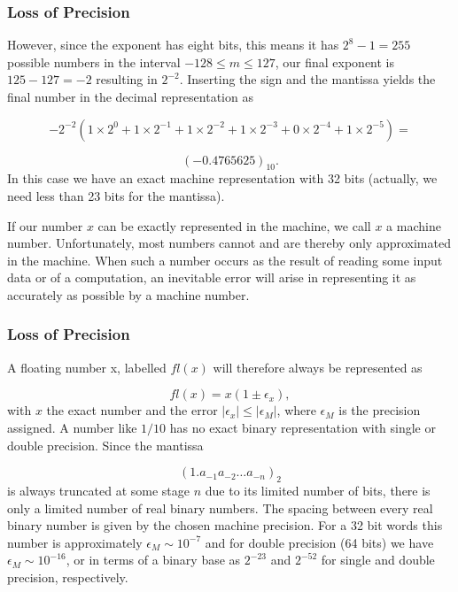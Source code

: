 \documentclass{beamer}
\newenvironment{block_mdfboxadmon}[1][]{\begin{block}{#1}}{\end{block}}
\begin{document}
\begin{frame}
\frametitle{Loss of Precision}

\begin{block_mdfboxadmon}
However, since the
exponent has eight bits, this means it has  $2^8-1=255$ possible numbers in the interval
$-128 \le m \le 127$, our final
exponent is $125-127=-2$ resulting in $2^{-2}$.
Inserting the sign and the mantissa yields the final number in the decimal representation as

\[
 -2^{-2}\left(1\times 2^0+1\times 2^{-1}+
1\times 2^{-2}+1\times 2^{-3}+0\times 2^{-4}+1\times 2^{-5}\right)=\]

\[
(-0.4765625)_{10}.
\]
In this case we have an exact machine representation with 32 bits (actually, we need less than
23 bits for the mantissa).

If our number $x$ can be exactly represented in the machine, we call
$x$ a machine number. Unfortunately, most numbers cannot  and are thereby
only approximated in the machine. When such a number occurs as the result
of reading some input data or of a computation, an inevitable error
will arise in representing it as accurately as possible by
a machine number.
\end{block_mdfboxadmon}
\end{frame}

\begin{frame}
\frametitle{Loss of Precision}

\begin{block_mdfboxadmon}
A floating number x, labelled $fl(x)$ will therefore always be represented as

\begin{equation}
  fl(x) = x(1\pm \epsilon_x),
\end{equation}
with $x$ the exact number and the error $|\epsilon_x| \le |\epsilon_M|$, where
$\epsilon_M$ is the precision assigned. A number like $1/10$ has no exact binary representation
with single or double precision. Since the mantissa

\[
\left(1.a_{-1}a_{-2}\dots a_{-n}\right)_2
\]
is always truncated at some stage $n$ due to its limited number of bits, there is only a
limited number of real binary numbers. The spacing between every real binary number is given by the
chosen machine precision.
For a 32 bit words this number is approximately
$ \epsilon_M \sim 10^{-7}$ and for double precision (64 bits) we have
$ \epsilon_M \sim 10^{-16}$, or in terms of a binary base
as $2^{-23}$ and $2^{-52}$ for single and double precision, respectively.
\end{block_mdfboxadmon}
\end{frame}
\end{document}
